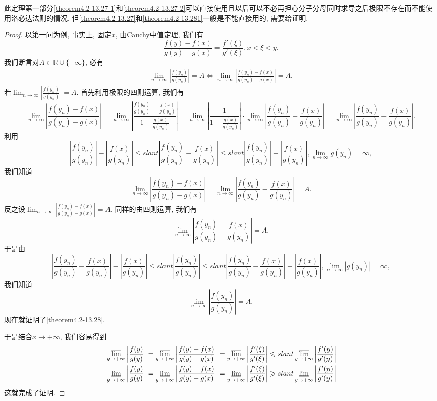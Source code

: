 \documentclass[../../main.tex]{subfiles}
\begin{document}
\begin{note}
此定理第一部分\eqref{theorem4.2-13.27-1}和\eqref{theorem4.2-13.27-2}可以直接使用且以后可以不必再担心分子分母同时求导之后极限不存在而不能使用洛必达法则的情况. 但\eqref{theorem4.2-13.27}和\eqref{theorem4.2-13.281}一般是不能直接用的, 需要给证明.
\end{note}
\begin{proof}
以第一问为例, 事实上, 固定\(x\), 由Cauchy中值定理, 我们有
\[
\frac{f(y)-f(x)}{g(y)-g(x)}=\frac{f'(\xi)}{g'(\xi)},x < \xi < y.
\]
我们断言对\(A \in \mathbb{R} \cup \{+\infty\}\), 必有
\begin{align}\label{theorem4.2-13.28}
\lim_{n\rightarrow\infty}\left|\frac{f(y_n)}{g(y_n)}\right| = A \Leftrightarrow \lim_{n\rightarrow\infty}\left|\frac{f(y_n)-f(x)}{g(y_n)-g(x)}\right| = A.
\end{align}
若\(\lim_{n\rightarrow\infty}\left|\frac{f(y_n)}{g(y_n)}\right| = A\). 首先利用极限的四则运算, 我们有
\[
\lim_{n\rightarrow\infty}\left|\frac{f(y_n)-f(x)}{g(y_n)-g(x)}\right|=\lim_{n\rightarrow\infty}\left|\frac{\frac{f(y_n)}{g(y_n)}-\frac{f(x)}{g(y_n)}}{1 - \frac{g(x)}{g(y_n)}}\right|=\lim_{n\rightarrow\infty}\left|\frac{1}{1 - \frac{g(x)}{g(y_n)}}\right|\cdot\lim_{n\rightarrow\infty}\left|\frac{f(y_n)}{g(y_n)}-\frac{f(x)}{g(y_n)}\right|=\lim_{n\rightarrow\infty}\left|\frac{f(y_n)}{g(y_n)}-\frac{f(x)}{g(y_n)}\right|.
\]
利用
\[
\left|\frac{f(y_n)}{g(y_n)}\right|-\left|\frac{f(x)}{g(y_n)}\right|\leqslant slant\left|\frac{f(y_n)}{g(y_n)}-\frac{f(x)}{g(y_n)}\right|\leqslant slant\left|\frac{f(y_n)}{g(y_n)}\right|+\left|\frac{f(x)}{g(y_n)}\right|, \lim_{n\rightarrow\infty} g(y_n) = \infty,
\]
我们知道
\[
\lim_{n\rightarrow\infty}\left|\frac{f(y_n)-f(x)}{g(y_n)-g(x)}\right|=\lim_{n\rightarrow\infty}\left|\frac{f(y_n)}{g(y_n)}-\frac{f(x)}{g(y_n)}\right| = A.
\]
反之设\(\lim_{n\rightarrow\infty}\left|\frac{f(y_n)-f(x)}{g(y_n)-g(x)}\right| = A\), 同样的由四则运算, 我们有
\[
\lim_{n\rightarrow\infty}\left|\frac{f(y_n)}{g(y_n)}-\frac{f(x)}{g(y_n)}\right| = A.
\]
于是由
\[
\left|\frac{f(y_n)}{g(y_n)}-\frac{f(x)}{g(y_n)}\right|-\left|\frac{f(x)}{g(y_n)}\right|\leqslant slant\left|\frac{f(y_n)}{g(y_n)}\right|\leqslant slant\left|\frac{f(y_n)}{g(y_n)}-\frac{f(x)}{g(y_n)}\right|+\left|\frac{f(x)}{g(y_n)}\right|, \lim_{n\rightarrow\infty}|g(y_n)| = \infty,
\]
我们知道
\[
\lim_{n\rightarrow\infty}\left|\frac{f(y_n)}{g(y_n)}\right| = A.
\]
现在就证明了\eqref{theorem4.2-13.28}.

于是结合\(x \to +\infty\), 我们容易得到
\begin{align*}
&\varlimsup_{y\rightarrow+\infty}\left|\frac{f(y)}{g(y)}\right|=\varlimsup_{y\rightarrow+\infty}\left|\frac{f(y)-f(x)}{g(y)-g(x)}\right|=\varlimsup_{y\rightarrow+\infty}\left|\frac{f'(\xi)}{g'(\xi)}\right|\leqslant slant\varlimsup_{y\rightarrow+\infty}\left|\frac{f'(y)}{g'(y)}\right|\\
&\varliminf_{y\rightarrow+\infty}\left|\frac{f(y)}{g(y)}\right|=\varliminf_{y\rightarrow+\infty}\left|\frac{f(y)-f(x)}{g(y)-g(x)}\right|=\varliminf_{y\rightarrow+\infty}\left|\frac{f'(\xi)}{g'(\xi)}\right|\geqslant slant\varliminf_{y\rightarrow+\infty}\left|\frac{f'(y)}{g'(y)}\right|
\end{align*}
这就完成了证明.
\end{proof}
\end{document}
